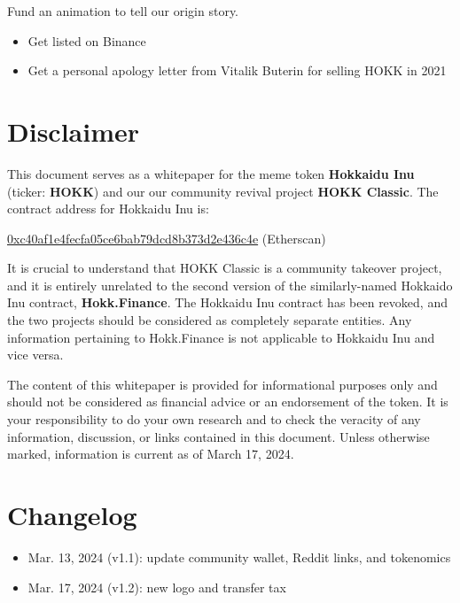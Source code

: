 \documentclass{article}
\begin{document}
\begin{tcolorbox}[colback=salmon1!10!white,colframe=salmon1,
  title=Phase 5: The King is Back,
  fonttitle=\bfseries]
  Fund an animation to tell our origin story.
\end{tcolorbox}
\begin{tcolorbox}[colback=salmon1!10!white,colframe=salmon1,
  title=Phase 6: Defeat Shiba Inu,
  fonttitle=\bfseries]
  \begin{itemize}
  \item Get listed on Binance
  \item Get a personal apology letter from Vitalik Buterin for selling HOKK in 2021
  \end{itemize}
\end{tcolorbox}

\newpage
\section{Disclaimer}
This document serves as a whitepaper for the meme token \textbf{Hokkaidu Inu} (ticker: \textbf{HOKK}) and our our community revival project \textbf{HOKK Classic}. The contract address for Hokkaidu Inu is:

\href{https://etherscan.io/token/0xc40af1e4fecfa05ce6bab79dcd8b373d2e436c4e}{0xc40af1e4fecfa05ce6bab79dcd8b373d2e436c4e} (Etherscan)

It is crucial to understand that HOKK Classic is a community takeover project, and it is entirely unrelated to the second version of the similarly-named Hokkaido Inu contract, \textbf{Hokk.Finance}. The Hokkaidu Inu contract has been revoked, and the two projects should be considered as completely separate entities. Any information pertaining to Hokk.Finance is not applicable to Hokkaidu Inu and vice versa.

The content of this whitepaper is provided for informational purposes only and should not be considered as financial advice or an endorsement of the token. It is your responsibility to do your own research and to check the veracity of any information, discussion, or links contained in this document. Unless otherwise marked, information is current as of March 17, 2024.

\section{Changelog}
\begin{itemize}
\item Mar. 13, 2024 (v1.1): update community wallet, Reddit links, and tokenomics
\item Mar. 17, 2024 (v1.2): new logo and transfer tax
\end{itemize}
\end{document}

